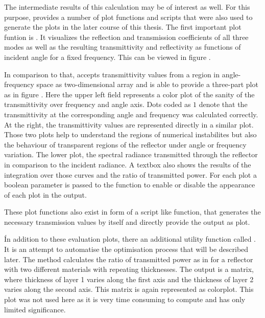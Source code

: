 The intermediate results of this calculation may be of interest as well. For
this purpose,  provides a number of plot functions and
scripts that were also used to generate the plots in the later course of this
thesis. The first important plot funtion is .
It visualizes the reflection and transmission coefficients of all three modes
as well as the resulting transmittivity and reflectivity as functions of
incident angle for a fixed frequency. This can be viewed in figure
.

In comparison to that,  accepts transmittivity values from
a region in angle-frequency space as two-dimensional array and is able to
provide a three-part plot as in figure . Here the
upper left field represents a color plot of the sanity of the transmittivity
over frequency and angle axis. Dots coded as $1$ denote that the transmittivity
at the corresponding angle and frequency was calculated correctly. At the
right, the transmittivity values are represented directly in a similar plot.
Those two plots help to understand the regions of numerical instabilites but
also the behaviour of transparent regions of the reflector under angle or
frequency variation. The lower plot, the spectral radiance transmitted through
the reflector in comparison to the incident radiance. A textbox also shows the
results of the integration over those curves and the ratio of transmitted
power.
For each plot a boolean parameter is passed to the function to enable or
disable the appearance of each plot in the output.

These plot functions also exist in form of a script like function, that
generates the necessary transmission values by itself and directly provide the
output as plot.

Ín addition to these evaluation plots, there an additional utility function
called
. It is an attempt to automatise the
optimisation process that will be described later. The method calculates the
ratio of transmitted power as in  for a reflector with
two different materials with repeating thicknesses. The output is a matrix,
where thickness of layer 1 varies along the first axis and the thickness of
layer 2 varies along the second axis. This matrix is again represented as
colorplot. This plot was not used here as it is very time consuming to compute
and has only limited significance.

